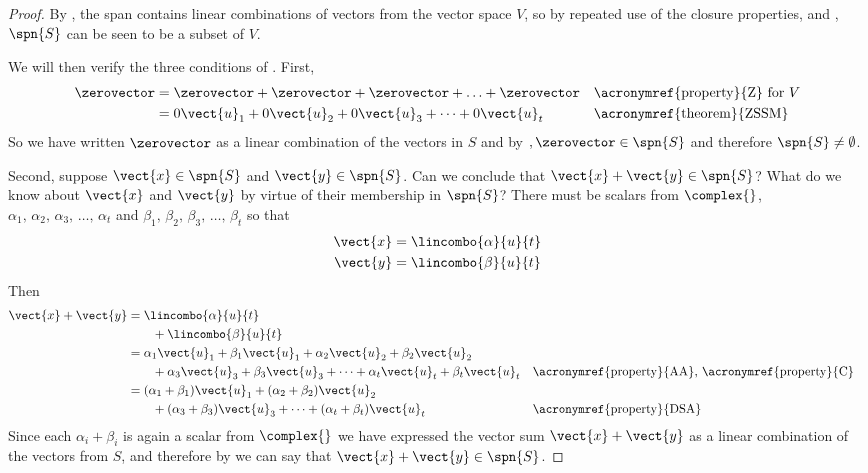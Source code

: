 \begin{proof}
By , the span contains linear combinations of vectors from the vector space $V$, so by repeated use of the closure properties,  and , $\spn{S}$ can be seen to be a subset of $V$.\par
%
We will then verify the three conditions of .  First,
%
\begin{align*}
\zerovector
&=\zerovector+\zerovector+\zerovector+\ldots+\zerovector&&\text{\acronymref{property}{Z} for $V$}\\
&=0\vect{u}_1+0\vect{u}_2+0\vect{u}_3+\cdots+0\vect{u}_t&&\text{\acronymref{theorem}{ZSSM}}
\end{align*}
%
So we have written $\zerovector$ as a linear combination of the vectors in $S$ and by $, \zerovector\in\spn{S}$ and therefore $\spn{S}\neq\emptyset$.\par
%
Second, suppose $\vect{x}\in\spn{S}$ and $\vect{y}\in\spn{S}$.  Can we conclude that $\vect{x}+\vect{y}\in\spn{S}$?  What do we know about $\vect{x}$ and $\vect{y}$ by virtue of their membership in $\spn{S}$?  There must be scalars from $\complex{\null}$,
$\alpha_1,\,\alpha_2,\,\alpha_3,\,\ldots,\,\alpha_t$ and
$\beta_1,\,\beta_2,\,\beta_3,\,\ldots,\,\beta_t$ so that
%
\begin{align*}
\vect{x}&=\lincombo{\alpha}{u}{t}\\
\vect{y}&=\lincombo{\beta}{u}{t}
\end{align*}
%
Then
%
\begin{align*}
\vect{x}+\vect{y}&=\lincombo{\alpha}{u}{t}\\
&\quad\quad+\lincombo{\beta}{u}{t}\\
&=\alpha_1\vect{u}_1+\beta_1\vect{u}_1+\alpha_2\vect{u}_2+\beta_2\vect{u}_2\\
&\quad\quad+\alpha_3\vect{u}_3+\beta_3\vect{u}_3+\cdots+\alpha_t\vect{u}_t+\beta_t\vect{u}_t&&\text{\acronymref{property}{AA}, \acronymref{property}{C}}\\
&=(\alpha_1+\beta_1)\vect{u}_1+(\alpha_2+\beta_2)\vect{u}_2\\
&\quad\quad+(\alpha_3+\beta_3)\vect{u}_3+\cdots+(\alpha_t+\beta_t)\vect{u}_t&&\text{\acronymref{property}{DSA}}
\end{align*}
%
Since each $\alpha_i+\beta_i$ is again a scalar from $\complex{\null}$ we have expressed the vector sum $\vect{x}+\vect{y}$ as a linear combination of the vectors from $S$, and therefore by  we can say that $\vect{x}+\vect{y}\in\spn{S}$.\par

\end{proof}
